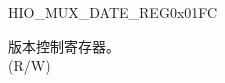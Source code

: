 \begin{register}{H}{IO\_MUX\_DATE\_REG}{0x01FC}\label{regdesc:IOMUXDATEREG}
%
%
\regnewline%
\begin{regdesc}\begin{reglist}
\label{fielddesc:IOMUXREGDATE}\item [IO\_MUX\_REG\_DATE] 版本控制寄存器。\\(R/W)
\end{reglist}\end{regdesc}
\end{register}


